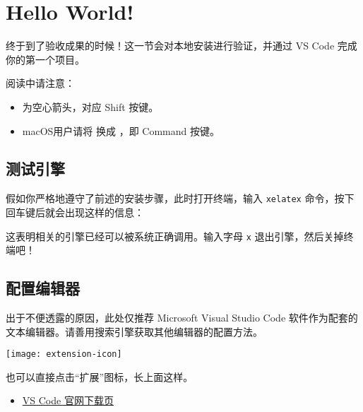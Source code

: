 \section{Hello World!}
\label{sec:hw}

\begin{widepar}
  终于到了验收成果的时候！这一节会对本地安装进行验证，并通过 VS Code 完成你的第一个项目。

  阅读中请注意：
  \begin{itemize}
    \item {} 为空心箭头，对应 Shift 按键。
    \item macOS用户请将  换成 ，即 Command 按键。
  \end{itemize}
\end{widepar}

\subsection{测试引擎}

假如你严格地遵守了前述的安装步骤，此时打开终端，输入 \texttt{xelatex} 命令，按下回车键后就会出现这样的信息：


这表明相关的引擎已经可以被系统正确调用。输入字母 \texttt{x} 退出引擎，然后关掉终端吧！

\subsection{配置编辑器}

出于不便透露的原因，此处仅推荐 Microsoft Visual Studio Code 软件作为配套的文本编辑器。请善用搜索引擎获取其他编辑器的配置方法。

\begin{marginfigure}
\centering
\texttt{[image: extension-icon]}
\caption{也可以直接点击“扩展”图标，长上面这样。}
\end{marginfigure}

\begin{itemize}
  \item \href{https://code.visualstudio.com/Download}{\faExternalLink* VS Code 官网下载页}
\end{itemize}

